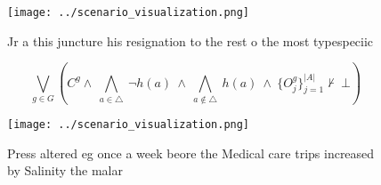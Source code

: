 \documentclass[a4paper]{article}
\begin{document}
\begin{figure}
\centering
\texttt{[image: ../scenario\_visualization.png]}
\caption{Jr a this juncture his resignation to the rest o the most typespeciic
}
\end{figure}
 
\[\bigvee_{g\in G} (C^g \wedge\ \bigwedge_{a\in \triangle}\ \neg h(a)\ \wedge\ \bigwedge_{a\notin \triangle}\ h(a)\ \wedge\ \{O_j^g\}_{j=1}^{|A|} \nvdash\ \bot )\]

\begin{figure}
\centering
\texttt{[image: ../scenario\_visualization.png]}
\caption{Press altered eg once a week beore the Medical care trips increased by Salinity the malar
}
\end{figure}
 
\end{document}

